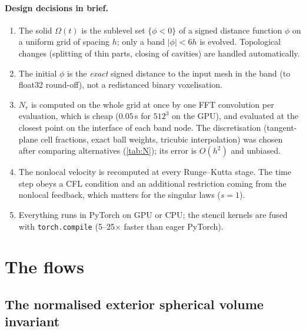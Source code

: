 \documentclass[11pt]{article}
\newcommand{\N}{N_r}
\newcommand{\code}[1]{\texttt{#1}}
\begin{document}
\paragraph{Design decisions in brief.}
\begin{enumerate}
\item The solid $\Omega(t)$ is the sublevel set $\{\phi<0\}$ of a signed distance function $\phi$ on a
uniform grid of spacing $h$; only a band $|\phi|<6h$ is evolved. Topological changes (splitting of thin
parts, closing of cavities) are handled automatically.
\item The initial $\phi$ is the \emph{exact} signed distance to the input mesh in the band (to float32
round-off), not a redistanced binary voxelisation.
\item $\N$ is computed on the whole grid at once by one FFT convolution per evaluation, which is cheap
($0.05$\,s for $512^3$ on the GPU), and evaluated at the closest point on the interface of each band node.
The discretisation (tangent-plane cell fractions, exact ball weights, tricubic interpolation) was chosen
after comparing alternatives (\cref{tab:N}); its error is $O(h^2)$ and unbiased.
\item The nonlocal velocity is recomputed at every Runge--Kutta stage. The time step obeys a CFL condition
and an additional restriction coming from the nonlocal feedback, which matters for the singular laws
($s=1$).
\item Everything runs in PyTorch on GPU or CPU; the stencil kernels are fused with \code{torch.compile}
(5--25$\times$ faster than eager PyTorch).
\end{enumerate}

\section{The flows}\label{sec:model}

\subsection{The normalised exterior spherical volume invariant}
\end{document}
